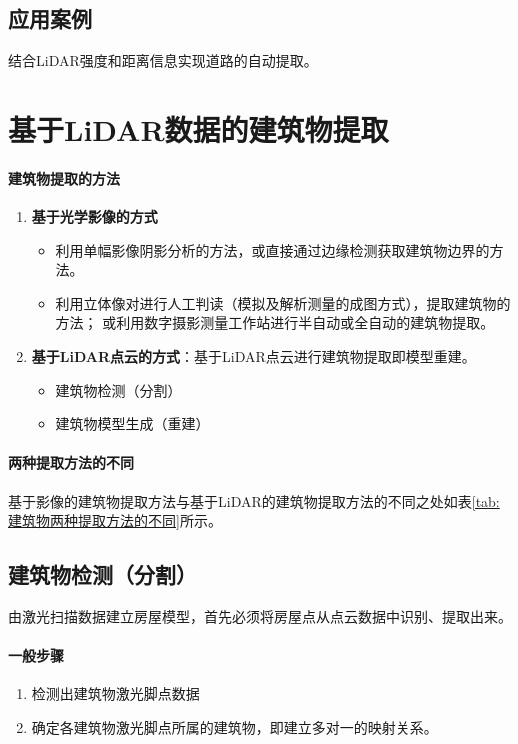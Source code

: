 \subsection{应用案例}

结合LiDAR强度和距离信息实现道路的自动提取。

\section{基于LiDAR数据的建筑物提取}

\paragraph{建筑物提取的方法}
\begin{enumerate}
	\item \textbf{基于光学影像的方式}
		\begin{itemize}
			\item 利用单幅影像阴影分析的方法，或直接通过边缘检测获取建筑物边界的方法。
			\item 利用立体像对进行人工判读（模拟及解析测量的成图方式），提取建筑物的方法；
				或利用数字摄影测量工作站进行半自动或全自动的建筑物提取。
		\end{itemize}
	\item \textbf{基于LiDAR点云的方式}：基于LiDAR点云进行建筑物提取即模型重建。
		\begin{itemize}
			\item 建筑物检测（分割）
			\item 建筑物模型生成（重建）
		\end{itemize}
\end{enumerate}

\paragraph{两种提取方法的不同}基于影像的建筑物提取方法与基于LiDAR的建筑物提取方法的不同之处如表\ref{tab:建筑物两种提取方法的不同}所示。

\subsection{建筑物检测（分割）}

由激光扫描数据建立房屋模型，首先必须将房屋点从点云数据中识别、提取出来。

\paragraph{一般步骤}
\begin{enumerate}
	\item 检测出建筑物激光脚点数据
	\item 确定各建筑物激光脚点所属的建筑物，即建立多对一的映射关系。
\end{enumerate}

